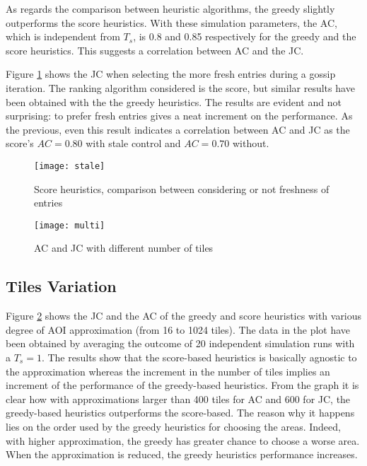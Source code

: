 \documentclass[final,10pt,a5paper]{phdimt}
\theoremstyle{definition}
\begin{document}
As regards the comparison between heuristic algorithms, the greedy slightly outperforms the score heuristics.
With these simulation parameters, the AC, which is independent from $T_s$, is 0.8 and 0.85 respectively for the greedy and the score heuristics. This suggests a correlation between AC and the JC.


Figure \ref{graph:ts} shows the JC when selecting the more fresh entries during a gossip iteration. The ranking algorithm considered is the score, but similar results have been obtained with the the greedy heuristics. The results are evident and not surprising: to prefer fresh entries gives a neat increment on the performance. 
As the previous, even this result indicates a  correlation between AC and JC as the score's $AC=0.80$ with stale control and $AC=0.70$ without.

\begin{figure}[tbh]
\centering
\texttt{[image: stale]}
\caption{Score heuristics, comparison between considering or not freshness of entries}
\label{graph:ts}
\end{figure}





\begin{figure}[tbh]
\centering
\texttt{[image: multi]}
\caption{AC and JC with different number of tiles}
\label{graph:tiles}
\end{figure}


\subsection{Tiles Variation}

Figure \ref{graph:tiles} shows the JC and the AC of the greedy and score heuristics with various degree of AOI approximation (from 16 to 1024 tiles). The data in the plot have been obtained by averaging the outcome of 20 independent simulation runs with a $T_s = 1$.
The results show that the score-based heuristics is basically agnostic to the approximation whereas the increment in the number of tiles implies an increment of the performance of the greedy-based heuristics. From the graph it is clear how with approximations larger than 400 tiles for AC and 600 for JC, the greedy-based heuristics outperforms the score-based.
The reason why it happens lies on the order used by the greedy heuristics for choosing the areas. Indeed, with higher approximation, the greedy has greater chance to choose a worse area. When the approximation is reduced, the greedy heuristics performance increases.
\end{document}
